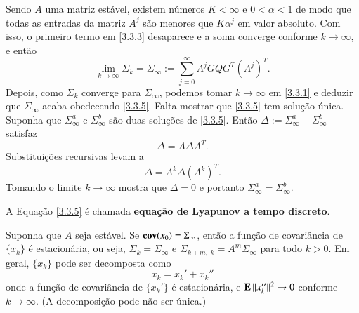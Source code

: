 \begin{Dem}
Sendo $A$ uma matriz estável, existem números $K<\infty$ e $0<\alpha<1$ de modo que todas as entradas da matriz $A^j$ são menores que $K\alpha^j$ em valor absoluto. Com isso, o primeiro termo em \eqref{3.3.3} desaparece e a soma converge conforme $k\to\infty$, e então
\[
	\lim_{k\to\infty}\Sigma_k=
	\Sigma_\infty:=
	\sum_{j=0}^{\infty}A^jGQG^T(A^j)^T.
\]
Depois, como $\Sigma_k$ converge para $\Sigma_\infty$, podemos tomar $k\to\infty$ em \eqref{3.3.1} e deduzir que $\Sigma_\infty$ acaba obedecendo \eqref{3.3.5}. Falta mostrar que \eqref{3.3.5} tem solução única. Suponha que $\Sigma^a_\infty$ e $\Sigma^b_\infty$ são duas soluções de \eqref{3.3.5}. Então $\Delta:=\Sigma^a_\infty-\Sigma^b_\infty$ satisfaz
\[
	\Delta = A\Delta A^T.
\]
Substituições recursivas levam a
\[
	\Delta = A^k\Delta(A^k)^T.
\]
Tomando o limite $k\to\infty$ mostra que $\Delta=0$ e portanto $\Sigma^a_\infty=\Sigma^b_\infty$.
\end{Dem}

A Equação \eqref{3.3.5} é chamada \textbf{equação de Lyapunov a tempo discreto}.

\begin{Exercicio}\label{3.3.6}
Suponha que $A$ seja estável. Se $\operatorname{\bf cov}(x_0)=\Sigma_\infty$, então a função de covariância de $\{x_k\}$ é estacionária, ou seja, $\Sigma_k=\Sigma_\infty$ e $\Sigma_{k+m,\;k}=A^m\Sigma_\infty$ para todo $k>0$. Em geral, $\{x_k\}$ pode ser decomposta como
\[
	x_k=x_k'+x_k''
\]
onde a função de covariância de $\{x_k'\}$ é estacionária, e $\operatorname{\bf E}\|x_k''\|^2\to0$ conforme $k\to\infty$. (A decomposição pode não ser única.)
\end{Exercicio}

